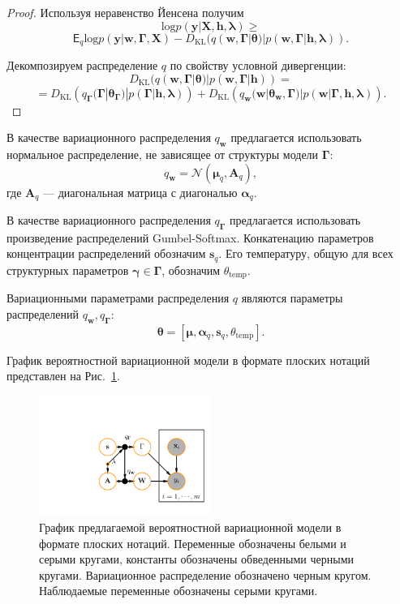 \begin{proof}
Используя неравенство Йенсена получим 
\[
\text{log} p(\mathbf{y}|\mathbf{X}, \mathbf{h}, \boldsymbol{\lambda}) \geq
\]
\[
   \mathsf{E}_{q} \text{log}p(\mathbf{y}|\mathbf{w}, \boldsymbol{\Gamma}, \mathbf{X}) - D_\text{KL}(q (\mathbf{w},\boldsymbol{\Gamma}|\boldsymbol{\theta})|p(\mathbf{w},\boldsymbol{\Gamma}|\mathbf{h}, \boldsymbol{\lambda})).
\]

Декомпозируем распределение $q$ по свойству условной дивергенции:
\[
D_\text{KL}(q (\mathbf{w},\boldsymbol{\Gamma}|\boldsymbol{\theta})|p(\mathbf{w},\boldsymbol{\Gamma}|\mathbf{h})) = 
\]
\[
=D_\text{KL}\left(q_{\boldsymbol{\Gamma}}(\boldsymbol{\Gamma}|\boldsymbol{\theta}_{\boldsymbol{\Gamma}})|p(\boldsymbol{\Gamma}|\mathbf{h}, \boldsymbol{\lambda})\right) + D_\text{KL}\left(q_{\mathbf{w}}(\mathbf{w}|\boldsymbol{\theta}_\mathbf{w},\boldsymbol{\Gamma})|p(\mathbf{w}|\boldsymbol{\Gamma}, \mathbf{h}, \boldsymbol{\lambda})\right).    
\]
\end{proof}

В качестве вариационного распределения $q_{\mathbf{w}}$ предлагается использовать нормальное распределение, не зависящее от структуры модели $\boldsymbol{\Gamma}$:
\[
    q_{\mathbf{w}} = \mathcal{N}(\boldsymbol{\mu}_q, \mathbf{A}_q), 
\]
где $\mathbf{A}_q$ --- диагональная матрица с диагональю $\boldsymbol{\alpha}_q$.

В качестве вариационного распределения $q_{\boldsymbol{\Gamma}}$ предлагается использовать произведение распределений Gumbel-Softmax. Конкатенацию параметров концентрации распределений обозначим $\mathbf{s}_q$. Его температуру, общую для всех структурных параметров $\boldsymbol{\gamma} \in \boldsymbol{\Gamma}$, обозначим $\theta_\text{temp}$.

Вариационными параметрами распределения $q$ являются параметры распределений $q_{\mathbf{w}}, q_{\boldsymbol{\Gamma}}$:
\[
    \boldsymbol{\theta} = [\boldsymbol{\mu}, \boldsymbol{\alpha}_q, \mathbf{s}_q, \theta_\text{temp}]. 
\]


График вероятностной вариационной модели в формате плоских нотаций представлен на Рис.~\ref{fig:plate_qprob}.
\begin{figure}
\centering
   \includegraphics[width=0.5\textwidth]{plots/notebooks/plate.pdf}
\caption{График предлагаемой вероятностной вариационной модели в формате плоских нотаций. Переменные обозначены белыми и серыми кругами, константы обозначены обведенными черными кругами. Вариационное распределение обозначено черным кругом. Наблюдаемые переменные обозначены серыми кругами.}
\label{fig:plate_qprob}
\end{figure}

